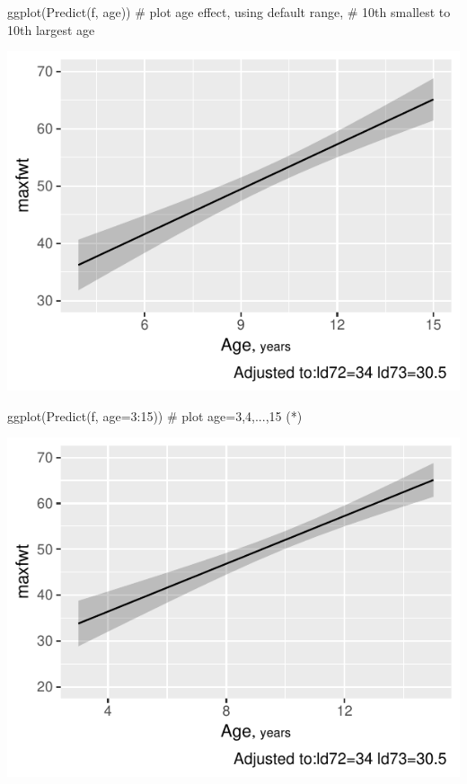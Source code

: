 \begin{Schunk}
\begin{Sinput}
ggplot(Predict(f, age))   # plot age effect, using default range,
                          # 10th smallest to 10th largest age
\end{Sinput}


\centerline{\includegraphics{rmsintro-unnamed-chunk-9-1} }

\end{Schunk}
\begin{Schunk}
\begin{Sinput}
ggplot(Predict(f, age=3:15))  # plot age=3,4,...,15 (*\ipacue*)
\end{Sinput}


\centerline{\includegraphics{rmsintro-unnamed-chunk-10-1} }

\end{Schunk}
